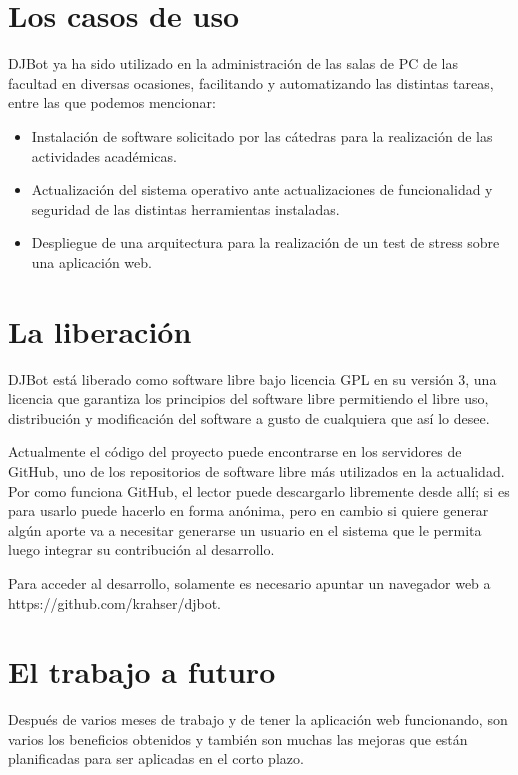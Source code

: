 \documentclass[runningheads,a4paper,titlepage]{llncs}
\begin{document}
\section{Los casos de uso}


\noindent DJBot ya ha sido utilizado en la administración de las salas de PC de las
facultad en diversas ocasiones, facilitando y automatizando las distintas
tareas, entre las que podemos mencionar:

\begin{itemize}
 \item Instalación de software solicitado por las cátedras para la realización
de las actividades académicas.
 \item Actualización del sistema operativo ante actualizaciones de funcionalidad
y seguridad de las distintas herramientas instaladas.
 \item Despliegue de una arquitectura para la realización de un test de stress
sobre una aplicación web. 
\end{itemize}

\section{La liberación}
\noindent DJBot está liberado como software libre bajo licencia GPL en su versión 3, una
licencia que garantiza los principios del software libre permitiendo el libre
uso, distribución y modificación del software a gusto de cualquiera que así lo
desee.

Actualmente el código del proyecto puede encontrarse en los servidores de
GitHub, uno de los repositorios de software libre más utilizados en la 
actualidad. Por como funciona GitHub, el lector puede descargarlo libremente
desde allí; si es para usarlo
puede hacerlo en forma anónima, pero en cambio si quiere generar algún aporte va
a
necesitar generarse un usuario en el sistema que le permita luego integrar su
contribución al desarrollo.

Para acceder al desarrollo, solamente es necesario apuntar un navegador web a
https://github.com/krahser/djbot.


\section{El trabajo a futuro}
\noindent Despu\'es de varios meses de trabajo y de tener la aplicaci\'on web funcionando,
son varios los beneficios obtenidos y tambi\'en son muchas las mejoras que están
planificadas para  ser aplicadas en el corto plazo. 
\end{document}
